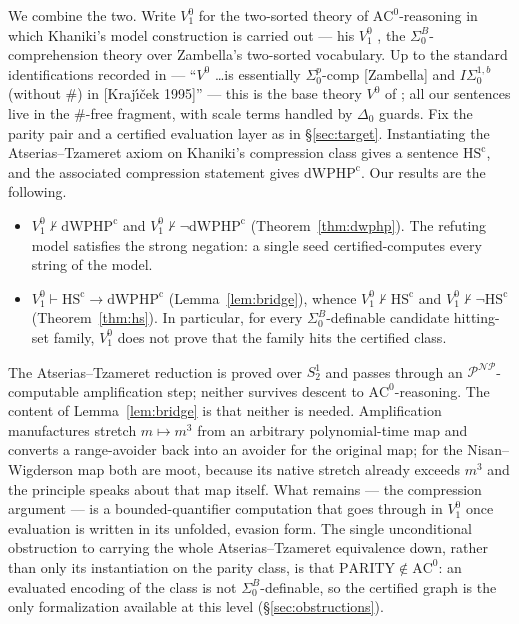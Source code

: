 \documentclass[11pt]{article}
\theoremstyle{definition}
\theoremstyle{remark}
\newcommand{\NP}{\mathscr{N\!P}}
\newcommand{\Vone}{V^0_1}
\newcommand{\HScert}{\mathrm{HS}^{\mathrm{c}}}
\newcommand{\dWPHPcert}{\mathrm{dWPHP}^{\mathrm{c}}}
\newcommand{\SigmaB}{\Sigma^B_0}
\begin{document}
We combine the two. Write $\Vone$ for the two-sorted theory of
$\mathrm{AC}^0$-reasoning in which Khaniki's model construction is carried out
--- his $V^0_1$ \cite[Theorem 2.3]{Khaniki2022}, the
$\SigmaB$-comprehension theory over Zambella's two-sorted vocabulary. Up to the
standard identifications recorded in \cite[Notes to Chapter V]{CookNguyen2010}
--- ``$V^0$ \dots is essentially $\Sigma^p_0$-comp [Zambella] and
$I\Sigma^{1,b}_0$ (without $\#$) in [Kraj\'{\i}\v{c}ek 1995]'' --- this is the
base theory $V^0$ of \cite{CookNguyen2010}; all our sentences live in the
$\#$-free fragment, with scale terms handled by $\Delta_0$ guards. Fix the parity pair and a
certified evaluation layer as in \S\ref{sec:target}. Instantiating the
Atserias--Tzameret axiom on Khaniki's compression class gives a sentence
$\HScert$, and the associated compression statement gives $\dWPHPcert$. Our
results are the following.

\begin{itemize}
\item[(A)] $\Vone\nvdash\dWPHPcert$ and $\Vone\nvdash\neg\dWPHPcert$
(Theorem~\ref{thm:dwphp}). The refuting model satisfies the strong negation:
a single seed certified-computes every string of the model.
\item[(B)] $\Vone\vdash\HScert\to\dWPHPcert$ (Lemma~\ref{lem:bridge}), whence
$\Vone\nvdash\HScert$ and $\Vone\nvdash\neg\HScert$ (Theorem~\ref{thm:hs}). In
particular, for every $\SigmaB$-definable candidate hitting-set family, $\Vone$
does not prove that the family hits the certified class.
\end{itemize}

The Atserias--Tzameret reduction is proved over $S^1_2$ and passes through an
$\mathscr P^{\NP}$-computable amplification step; neither survives descent to
$\mathrm{AC}^0$-reasoning. The content of Lemma~\ref{lem:bridge} is that neither
is needed. Amplification manufactures stretch $m\mapsto m^3$ from an arbitrary
polynomial-time map and converts a range-avoider back into an avoider for the
original map; for the Nisan--Wigderson map both are moot, because its native
stretch already exceeds $m^3$ and the principle speaks about that map itself.
What remains --- the compression argument --- is a bounded-quantifier
computation that goes through in $\Vone$ once evaluation is written in its
unfolded, evasion form. The single unconditional obstruction to carrying the
whole Atserias--Tzameret equivalence down, rather than only its instantiation
on the parity class, is that $\mathrm{PARITY}\notin\mathrm{AC}^0$: an evaluated
encoding of the class is not $\SigmaB$-definable, so the certified graph is the
only formalization available at this level (\S\ref{sec:obstructions}).
\end{document}
